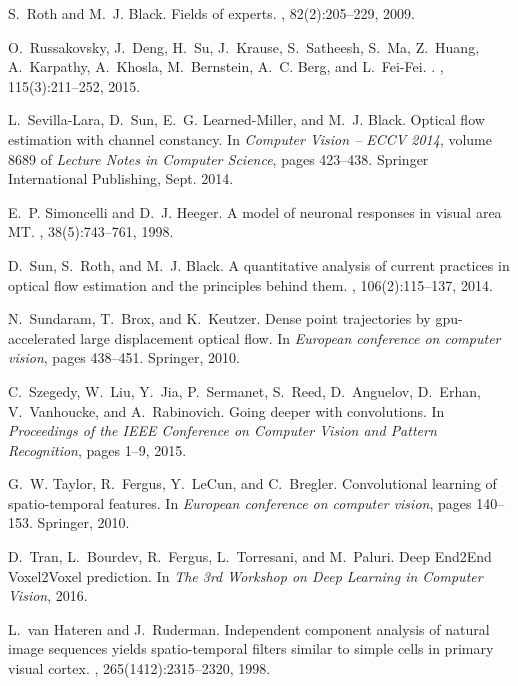 \documentclass[10pt,twocolumn,letterpaper]{article}
\begin{document}
\begin{thebibliography}{10}
S.~Roth and M.~J. Black.
\newblock Fields of experts.
, 82(2):205--229, 2009.

O.~Russakovsky, J.~Deng, H.~Su, J.~Krause, S.~Satheesh, S.~Ma, Z.~Huang,
  A.~Karpathy, A.~Khosla, M.~Bernstein, A.~C. Berg, and L.~Fei-Fei.
.
,
  115(3):211--252, 2015.

L.~Sevilla-Lara, D.~Sun, E.~G. Learned-Miller, and M.~J. Black.
\newblock Optical flow estimation with channel constancy.
\newblock In {\em Computer Vision -- ECCV 2014}, volume 8689 of {\em Lecture
  Notes in Computer Science}, pages 423--438. Springer International
  Publishing, Sept. 2014.

E.~P. Simoncelli and D.~J. Heeger.
\newblock A model of neuronal responses in visual area {MT}.
, 38(5):743--761, 1998.

D.~Sun, S.~Roth, and M.~J. Black.
\newblock A quantitative analysis of current practices in optical flow
  estimation and the principles behind them.
, 106(2):115--137,
  2014.

N.~Sundaram, T.~Brox, and K.~Keutzer.
\newblock Dense point trajectories by gpu-accelerated large displacement
  optical flow.
\newblock In {\em European conference on computer vision}, pages 438--451.
  Springer, 2010.

C.~Szegedy, W.~Liu, Y.~Jia, P.~Sermanet, S.~Reed, D.~Anguelov, D.~Erhan,
  V.~Vanhoucke, and A.~Rabinovich.
\newblock Going deeper with convolutions.
\newblock In {\em Proceedings of the IEEE Conference on Computer Vision and
  Pattern Recognition}, pages 1--9, 2015.

G.~W. Taylor, R.~Fergus, Y.~LeCun, and C.~Bregler.
\newblock Convolutional learning of spatio-temporal features.
\newblock In {\em European conference on computer vision}, pages 140--153.
  Springer, 2010.

D.~Tran, L.~Bourdev, R.~Fergus, L.~Torresani, and M.~Paluri.
\newblock Deep {End2End} {Voxel2Voxel} prediction.
\newblock In {\em The 3rd Workshop on Deep Learning in Computer Vision}, 2016.

L.~van Hateren and J.~Ruderman.
\newblock Independent component analysis of natural image sequences yields
  spatio-temporal filters similar to simple cells in primary visual cortex.
, 265(1412):2315–2320, 1998.


\end{thebibliography}
\end{document}
